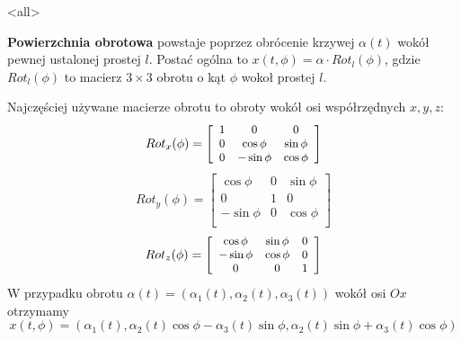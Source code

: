 \mode<all>{}
\begin{frame}[<+->]

\begin{definicja}
\textbf{Powierzchnia obrotowa} powstaje poprzez obrócenie krzywej $\alpha(t)$ wokół pewnej ustalonej prostej $l$. Postać ogólna to $x(t,\phi)=\alpha\cdot Rot_l(\phi)$, gdzie $Rot_l(\phi)$ to macierz $3\times 3$ obrotu o kąt $\phi$ wokoł prostej $l$.
\begin{center}

\end{center}
\end{definicja}
\end{frame}
\begin{frame}
Najczęściej używane macierze obrotu to obroty wok\'oł osi wsp\'ołrzędnych $x,y,z$:
\[\small Rot_{x}(\phi)=\left[\begin{array}{ccc}
1 & 0 & 0\\
0 & \cos\phi & \sin\phi\\
0 & -\sin\phi & \cos\phi\\
\end{array}\right]\]
\[
Rot_{y}(\phi)=\left[\begin{array}{ccc}
\cos\phi & 0 & \sin\phi\\
0 & 1 & 0\\
-\sin\phi & 0 & \cos\phi\\
\end{array}\right]\]
\[\small Rot_{z}(\phi)=\left[\begin{array}{ccc}
\cos\phi & \sin\phi & 0 \\
-\sin\phi & \cos\phi & 0\\
0 & 0 & 1\\
\end{array}\right]\]
\pause W przypadku obrotu $\alpha (t)=(\alpha_1(t),\alpha_2(t),\alpha_3(t))$ wok\'oł osi $Ox$ otrzymamy
\[x(t,\phi)=\left(\alpha_1(t),\alpha_2(t)\cos\phi-\alpha_3(t)\sin\phi,\alpha_2 (t)\sin\phi+\alpha_3 (t)\cos\phi\right)\]

\end{frame}



